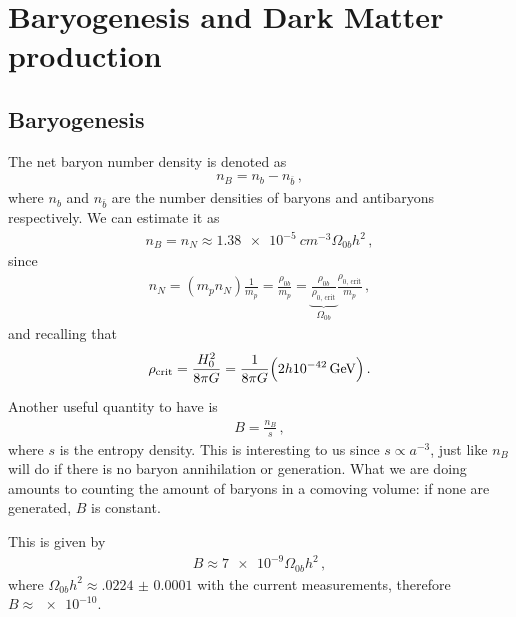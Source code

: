 \documentclass[main.tex]{subfiles}
\begin{document}
\chapter{Baryogenesis and Dark Matter production}

\section{Baryogenesis}


The net baryon number density is denoted as 
%
\begin{align}
n_B = n_b - n_{\overline{b}}
\,,
\end{align}
%
where \(n_b\) and \(n_{\overline{b}}\) are the number densities of baryons and antibaryons respectively. 
We can estimate it as 
%
\begin{align}
n_B = n_N \approx \SI{1.38e-5}{cm^{-3}} \Omega_{0b} h^2
\,,
\end{align}
%
since
%
\begin{align}
n_N = (m_p n_N) \frac{1}{m_p} = \frac{\rho_{0b}}{m_p} 
= \underbrace{\frac{\rho_{0b}}{\rho _{\text{0, crit}}}}_{\Omega_{0b}} \frac{\rho _{\text{0, crit}}}{m_p}
\,,
\end{align}
%
and recalling that 
%
\begin{align}
\rho _{\text{crit}} = \frac{H_0^2}{8 \pi G} = \frac{1}{8 \pi G} \qty(2 h \SI{e-42}{GeV} ) 
\,.
\end{align}

Another useful quantity to have is 
%
\begin{align}
B = \frac{n_B}{s}
\,,
\end{align}
%
where \(s\) is the entropy density.
This is interesting to us since \(s \propto a^{-3}\), just like \(n_B\) will do if there is no baryon annihilation or generation. 
What we are doing amounts to counting the amount of baryons in a comoving volume: if none are generated, \(B\) is constant. 

This is given by 
%
\begin{align}
B \approx \num{7e-9} \Omega_{0b} h^2
\,,
\end{align}
%
where \(\Omega_{0b} h^2 \approx \num{.0224(1)}\) with the current measurements, therefore \(B \approx \num{e-10}\).
    
\end{document}
